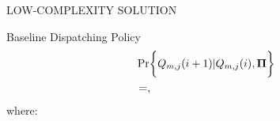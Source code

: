 \documentclass[10pt, conference, letterpaper]{IEEEtran}
\renewcommand{\vec}{\mathbf}
\DeclarePairedDelimiter{\Brace}{\bigg\{}{\bigg\}}
\newcommand{\apSet}{\mathcal{K}}
\newcommand{\Stat}{\mathbf{S}}
\newcommand{\Obsv}{\mathcal{Y}}
\newcommand{\Policy}{\boldsymbol{\Omega}}
\begin{document}
\begin{section}{LOW-COMPLEXITY SOLUTION}
\begin{subsection}{Baseline Dispatching Policy}
            \begin{align}
                &\Pr \Brace{Q_{m,j}(i+1)|Q_{m,j}(i),\vec{\Pi}}
                \nonumber\\
                &=,
            \end{align}
            where:
        \end{subsection}


\end{section}
\end{document}
